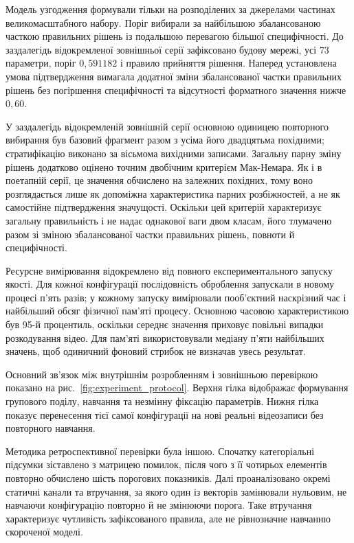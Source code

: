 Модель узгодження формували тільки на розподілених за джерелами частинах великомасштабного набору. Поріг вибирали за найбільшою збалансованою часткою правильних рішень із подальшою перевагою більшої специфічності. До заздалегідь відокремленої зовнішньої серії зафіксовано будову мережі, усі $73$ параметри, поріг $0{,}591182$ і правило прийняття рішення. Наперед установлена умова підтвердження вимагала додатної зміни збалансованої частки правильних рішень без погіршення специфічності та відсутності форматного значення нижче $0{,}60$.

У заздалегідь відокремленій зовнішній серії основною одиницею повторного вибирання був базовий фрагмент разом з усіма його двадцятьма похідними; стратифікацію виконано за вісьмома вихідними записами. Загальну парну зміну рішень додатково оцінено точним двобічним критерієм Мак-Немара. Як і в поетапній серії, це значення обчислено на залежних похідних, тому воно розглядається лише як допоміжна характеристика парних розбіжностей, а не як самостійне підтвердження значущості. Оскільки цей критерій характеризує загальну правильність і не надає однакової ваги двом класам, його тлумачено разом зі зміною збалансованої частки правильних рішень, повноти й специфічності.

Ресурсне вимірювання відокремлено від повного експериментального запуску якості. Для кожної конфігурації послідовність оброблення запускали в новому процесі п’ять разів; у кожному запуску вимірювали пооб’єктний наскрізний час і найбільший обсяг фізичної пам’яті процесу. Основною часовою характеристикою був 95-й процентиль, оскільки середнє значення приховує повільні випадки розкодування відео. Для пам’яті використовували медіану п’яти найбільших значень, щоб одиничний фоновий стрибок не визначав увесь результат.

Основний зв’язок між внутрішнім розробленням і зовнішньою перевіркою показано на рис.~\ref{fig:experiment_protocol}. Верхня гілка відображає формування групового поділу, навчання та незмінну фіксацію параметрів. Нижня гілка показує перенесення тієї самої конфігурації на нові реальні відеозаписи без повторного навчання.



Методика ретроспективної перевірки була іншою. Спочатку категоріальні підсумки зіставлено з матрицею помилок, після чого з її чотирьох елементів повторно обчислено шість порогових показників. Далі проаналізовано окремі статичні канали та втручання, за якого один із векторів замінювали нульовим, не навчаючи конфігурацію повторно й не змінюючи порога. Таке втручання характеризує чутливість зафіксованого правила, але не рівнозначне навчанню скороченої моделі.


